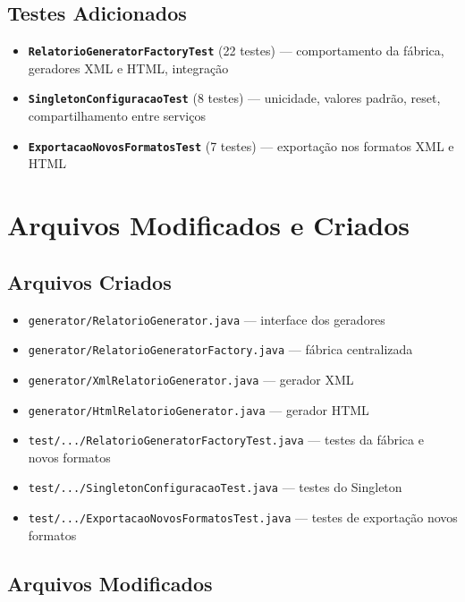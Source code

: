 \documentclass[12pt, a4paper]{article}
\begin{document}
\subsection{Testes Adicionados}

\begin{itemize}
    \item \textbf{\texttt{RelatorioGeneratorFactoryTest}} (22 testes) --- comportamento da fábrica, geradores XML e HTML, integração
    \item \textbf{\texttt{SingletonConfiguracaoTest}} (8 testes) --- unicidade, valores padrão, reset, compartilhamento entre serviços
    \item \textbf{\texttt{ExportacaoNovosFormatosTest}} (7 testes) --- exportação nos formatos XML e HTML
\end{itemize}

\section{Arquivos Modificados e Criados}

\subsection{Arquivos Criados}

\begin{itemize}
    \item \texttt{generator/RelatorioGenerator.java} --- interface dos geradores
    \item \texttt{generator/RelatorioGeneratorFactory.java} --- fábrica centralizada
    \item \texttt{generator/XmlRelatorioGenerator.java} --- gerador XML
    \item \texttt{generator/HtmlRelatorioGenerator.java} --- gerador HTML
    \item \texttt{test/.../RelatorioGeneratorFactoryTest.java} --- testes da fábrica e novos formatos
    \item \texttt{test/.../SingletonConfiguracaoTest.java} --- testes do Singleton
    \item \texttt{test/.../ExportacaoNovosFormatosTest.java} --- testes de exportação novos formatos
\end{itemize}

\subsection{Arquivos Modificados}
\end{document}
